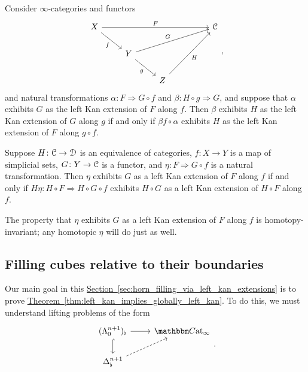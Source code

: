 \documentclass[main.tex]{subfiles}
\begin{document}
\begin{proposition}
  \label{prop:kan_extend_along_composition}
  Consider $\infty$-categories and functors
  \begin{equation*}
    \begin{tikzcd}
      X
      \arrow[dr, swap, "f"]
      \arrow[rrrr, "F"]
      &&&& \category{C}
      \\
      & Y
      \arrow[urrr, "G"]
      \arrow[dr, swap, "g"]
      \\
      && Z
      \arrow[uurr, swap, "H"]
    \end{tikzcd},
  \end{equation*}
  and natural transformations $\alpha\colon F \Rightarrow G \circ f$ and $\beta\colon H \circ g \Rightarrow G$, and suppose that $\alpha$ exhibits $G$ as the left Kan extension of $F$ along $f$. Then $\beta$ exhibits $H$ as the left Kan extension of $G$ along $g$ if and only if $\beta f \circ \alpha$ exhibits $H$ as the left Kan extension of $F$ along $g \circ f$.
\end{proposition}

\begin{proposition}
  \label{prop:kan_ext_invariance_of_target}
  Suppose $H\colon \mathcal{C} \to \mathcal{D}$ is an equivalence of categories, $f\colon X \to Y$ is a map of simplicial sets, $G\colon Y \to \mathcal{C}$ is a functor, and $\eta\colon F \Rightarrow G \circ f$ is a natural transformation. Then $\eta$ exhibits $G$ as a left Kan extension of $F$ along $f$ if and only if $H\eta\colon H \circ F \Rightarrow H \circ G \circ f$ exhibits $H \circ G$ as a left Kan extension of $H \circ F$ along $f$.
\end{proposition}

\begin{proposition}
  \label{prop:homotopy_invariance_of_witness}
  The property that $\eta$ exhibits $G$ as a left Kan extension of $F$ along $f$ is homotopy-invariant; any homotopic $\eta$ will do just as well.
\end{proposition}

\subsection{Filling cubes relative to their boundaries}
\label{ssc:filling_cubes_relative_to_their_boundary}

Our main goal in this \hyperref[sec:horn_filling_via_left_kan_extensions]{Section~\ref*{sec:horn_filling_via_left_kan_extensions}} is to prove \hyperref[thm:left_kan_implies_globally_left_kan]{Theorem~\ref*{thm:left_kan_implies_globally_left_kan}}. To do this, we must understand lifting problems of the form
\begin{equation*}
  \begin{tikzcd}
    (\Lambda^{n+1}_{0})_{\flat}
    \arrow[r]
    \arrow[d, hook]
    & \ICCat
    \\
    \Delta^{n+1}_{\flat}
    \arrow[ur, dashed]
  \end{tikzcd}.
\end{equation*}
\end{document}
